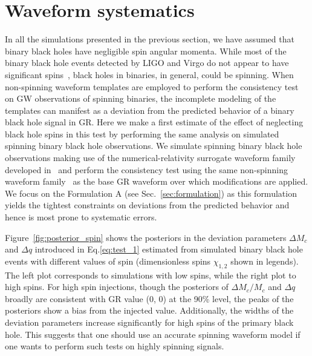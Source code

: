 \documentclass[prd,preprintnumbers,twocolumn,eqsecnum,floatfix,a4paper,nofootinbib,superscriptaddress]{revtex4}
\begin{document}
\section{Waveform systematics}
\label{sec:waveformsyst}

In all the simulations presented in the previous section, we have assumed that binary black holes have negligible spin angular momenta. While most of the binary black hole events detected by LIGO and Virgo do not appear to have significant spins~\cite{abbott2019gwtc}, black holes in binaries, in general, could be spinning. When non-spinning waveform templates are employed to perform the consistency test on GW observations of spinning binaries, the incomplete modeling of the templates can manifest as a deviation from the predicted behavior of a binary black hole signal in GR. Here we make a first estimate of the effect of neglecting black hole spins in this test by performing the same analysis on simulated spinning binary black hole observations. We simulate spinning binary black hole observations making use of the numerical-relativity surrogate waveform family developed in~\cite{varma2019surrogate} and perform the consistency test using the same non-spinning waveform family~\cite{Mehta:2017jpq} as the base GR waveform over which modifications are applied. We focus on the Formulation A (see Sec.~\ref{sec:formulation}) as this formulation yields the tightest constraints on deviations from the predicted behavior and hence is most prone to systematic errors. 

Figure~\ref{fig:posterior_spin} shows the posteriors in the deviation parameters $\Delta M_c$ and $\Delta q$ introduced in Eq.\eqref{eq:test_1} estimated from simulated binary black hole events with different values of spin (dimensionless spins $\chi_{1,2}$ shown in legends). The left plot corresponds to simulations with low spins, while the right plot to high spins.  For high spin injections, though the posteriors of $\Delta M_c/M_c$ and $\Delta q$ broadly are consistent with GR value (0, 0) at the 90\% level, the peaks of the posteriors show a bias from the injected value. Additionally, the widths of the deviation parameters increase significantly for high spins of the primary black hole. This suggests that one should use an accurate spinning waveform model if one wants to perform such tests on highly spinning signals. 
\end{document}
